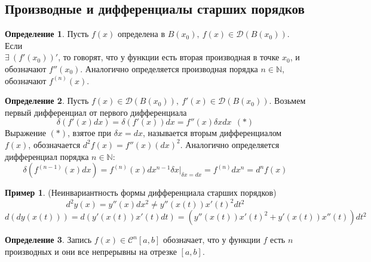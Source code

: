 \documentclass[a4paper, 12pt]{article}
\newcommand{\N}{\mathbb{N}}
\theoremstyle{definition}
\newtheorem*{definition}{Определение}
\newtheorem*{example}{Пример}
\begin{document}
        \subsection{Производные и дифференциалы старших порядков}
        \begin{definition}
            Пусть $f(x)$ определена в $B(x_0),\ f(x)\in \mathcal{D}(B(x_0))$. Если\\
            $\exists\ (f'(x_0))'$, то говорят, что у функции есть вторая производная в точке $x_0$, и обозначают $f''(x_0)$. Аналогично определяется производная порядка $n\in \N$, обозначают $f^{(n)}(x)$.
        \end{definition} 
        \begin{definition}
            Пусть $f(x)\in \mathcal{D}(B(x_0)),\ f'(x)\in \mathcal{D}(B(x_0))$. Возьмем первый дифференциал от первого дифференциала 
            \[\delta(f'(x)dx)=\delta(f'(x))dx=f''(x)\delta x dx\ \ (\ast)\]
            Выражение $(\ast)$, взятое при $\delta x=dx$, называется вторым дифференциалом $f(x)$, обозначается $d^2f(x)=f''(x)(dx)^2$. Аналогично определяется дифференциал порядка $n\in \N$:
            \[\delta(f^{(n-1)}(x)dx)=f^{(n)}(x)dx^{n-1}\delta x|_{\delta x=dx}=f^{(n)}dx^n=d^n  f(x)\]
        \end{definition} 
        \begin{example} (Неинвариантность формы дифференциала старших порядков)
            \[d^2y(x)=y''(x)dx^2\ne y''(x(t))x'(t)^2dt^2\]
            \[d(dy(x(t)))=d(y'(x(t))x'(t)dt)=(y''(x(t))x'(t)^2+y'(x(t))x''(t))dt^2\]
        \end{example}
        \begin{definition}
            Запись $f(x)\in \mathcal{C}^n[a,b]$ обозначает, что у функции $f$ есть $n$ производных и они все непрерывны на отрезке $[a,b]$. 
        \end{definition} 
\end{document}
